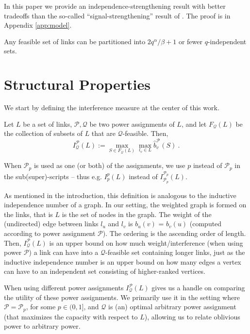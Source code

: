 \documentclass[11pt]{amsart}
\newcommand{\cal}[1]{\mathcal{#1}}
\def\calP{{\cal P}}
\def\calQ{{\cal Q}}
\def\calP{{\cal P}}   \def\calM{{\cal M}}   \def\calU{{\cal U}}   \newcommand{\PCopt}{\overline{OPT}}
\newcommand{\powp}{\calP_p}
\begin{document}
In this paper we provide an independence-strengthening result with better
tradeoffs than the so-called ``signal-strengthening'' result of \cite{HW09}.
The proof is in Appendix \ref{app:model}.

\begin{lemma}
Any feasible set of links can be partitioned into $2q^\alpha/\beta+1$ or fewer $q$-independent sets.
\label{lem:indep}
\end{lemma}



\section{Structural Properties}
\label{sec:structural}

\def\gprop{\mathcal{P}}

We start by defining the interference measure at the center of this work. 

\begin{defn}
Let $L$ be a set of links, $\calP, \calQ$ be two power assignments of $L$, and let $F_{\calQ}(L)$ be the collection of subsets of $L$ that are $\calQ$-feasible. 
Then,
$$I^{\calP}_{\calQ}(L) := \max_{S \in F_{\calQ}(L)} \max_{l_v \in L} \hat{b}^{\calP}_v(S)\ . $$
\end{defn} 
When $\powp$ is used as one (or both) of the assignments, we use $p$ instead of $\powp$ in the sub(super)-scripts -- thus e.g. $I^p_p(L)$ instead of $I^{\powp}_{\powp}(L)$.

As mentioned in the introduction, this definition is analogous to the 
inductive independence number of a graph.
In our setting, the weighted graph is formed on the links, that is $L$ is the set of nodes in the graph. The weight 
of the (undirected) edge between
links $l_u$ and $l_v$ is $b_u(v)$ = $b_v(u)$ (computed according to power assignment $\calP$). The ordering is the ascending
order of length. Then, $I^{\calP}_{\calQ}(L)$ is an upper bound on how much
weight/interference (when using power $\calP$) a link can have into a $\calQ$-feasible set containing longer links, just as the 
inductive independence number is an upper bound on how many edges a vertex 
can have to an independent set consisting of higher-ranked vertices.

When using different power assignments $I^{\calP}_{\calQ}(L)$ gives us a handle on comparing the utility of these power assignments. 
We primarily use it in the setting where $\calP = \powp$,
for some $p \in (0, 1]$, and $\calQ$ is (an) optimal arbitrary power assignment (that maximizes the capacity with respect to $L$), 
allowing us to relate oblivious power to arbitrary power.
\end{document}
